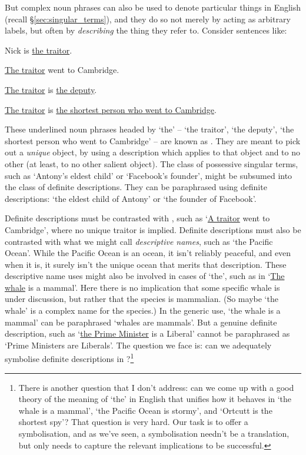 But complex noun phrases can also be used to denote particular things in English (recall §\ref{sec:singular_terms}), and they do so not merely by acting as arbitrary labels, but often by \emph{describing} the thing they refer to. Consider sentences like:
	\begin{earg}
		\item[\ex{traitor1}] Nick is \underline{the traitor}.
		\item[\ex{traitor2}] \underline{The traitor} went to Cambridge.
		\item[\ex{traitor3}] \underline{The traitor} is \underline{the deputy}.
		\item[\ex{traitor4}] \underline{The traitor} is \underline{the shortest person who went to Cambridge}.
	\end{earg}
These underlined noun phrases headed by `the' – `the traitor', `the deputy', `the shortest person who went to Cambridge' – are known as . They are meant to pick out a \emph{unique} object, by using a description which applies to that object and to no other (at least, to no other salient object). The class of possessive singular terms, such as `Antony's eldest child' or `Facebook's founder', might be subsumed into the class of definite descriptions. They can be paraphrased using definite descriptions: `the eldest child of Antony' or `the founder of Facebook'. 

Definite descriptions must be contrasted with , such as `\underline{A traitor} went to Cambridge', where no unique traitor is implied. Definite descriptions must also be contrasted with what we might call \emph{descriptive names}, such as `the Pacific Ocean'. While the Pacific Ocean is an ocean, it isn't reliably peaceful, and even when it is, it surely isn't the unique ocean that merits that description. These descriptive name uses might also be involved in cases of  `the', such as in `\underline{The whale} is a mammal'. Here there is no implication that some specific whale is under discussion, but rather that the species is mammalian. (So maybe `the whale' is a complex name for the species.) In the generic use, `the whale is a mammal' can be paraphrased `whales are mammals'. But a genuine definite description, such as `\underline{the Prime Minister} is a Liberal' cannot be paraphrased as `Prime Ministers are Liberals'. The question we face is: can we adequately symbolise definite descriptions in \FOL?\footnote{There is another question that I don't address: can we come up with a good theory of the meaning of `the' in English that unifies how it behaves in `the whale is a mammal', `the Pacific Ocean is stormy', and `Ortcutt is the shortest spy'? That question is very hard. Our task is to offer a symbolisation, and as we've seen, a symbolisation needn't be a translation, but only needs to capture the relevant implications to be successful.}


